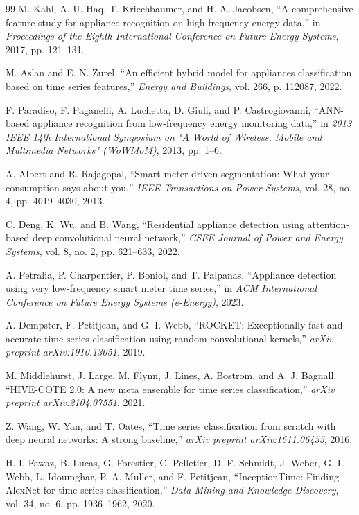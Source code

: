 \documentclass[conference]{IEEEtran}
\begin{document}
\begin{thebibliography}{99}
M. Kahl, A. U. Haq, T. Kriechbaumer, and H.-A. Jacobsen, ``A comprehensive feature study for appliance recognition on high frequency energy data,'' in \textit{Proceedings of the Eighth International Conference on Future Energy Systems}, 2017, pp. 121--131.

M. Aslan and E. N. Zurel, ``An efficient hybrid model for appliances classification based on time series features,'' \textit{Energy and Buildings}, vol. 266, p. 112087, 2022.

F. Paradiso, F. Paganelli, A. Luchetta, D. Giuli, and P. Castrogiovanni, ``ANN-based appliance recognition from low-frequency energy monitoring data,'' in \textit{2013 IEEE 14th International Symposium on "A World of Wireless, Mobile and Multimedia Networks" (WoWMoM)}, 2013, pp. 1--6.

A. Albert and R. Rajagopal, ``Smart meter driven segmentation: What your consumption says about you,'' \textit{IEEE Transactions on Power Systems}, vol. 28, no. 4, pp. 4019--4030, 2013.

C. Deng, K. Wu, and B. Wang, ``Residential appliance detection using attention-based deep convolutional neural network,'' \textit{CSEE Journal of Power and Energy Systems}, vol. 8, no. 2, pp. 621--633, 2022.

A. Petralia, P. Charpentier, P. Boniol, and T. Palpanas, ``Appliance detection using very low-frequency smart meter time series,'' in \textit{ACM International Conference on Future Energy Systems (e-Energy)}, 2023.

A. Dempster, F. Petitjean, and G. I. Webb, ``ROCKET: Exceptionally fast and accurate time series classification using random convolutional kernels,'' \textit{arXiv preprint arXiv:1910.13051}, 2019.

M. Middlehurst, J. Large, M. Flynn, J. Lines, A. Bostrom, and A. J. Bagnall, ``HIVE-COTE 2.0: A new meta ensemble for time series classification,'' \textit{arXiv preprint arXiv:2104.07551}, 2021.

Z. Wang, W. Yan, and T. Oates, ``Time series classification from scratch with deep neural networks: A strong baseline,'' \textit{arXiv preprint arXiv:1611.06455}, 2016.

H. I. Fawaz, B. Lucas, G. Forestier, C. Pelletier, D. F. Schmidt, J. Weber, G. I. Webb, L. Idoumghar, P.-A. Muller, and F. Petitjean, ``InceptionTime: Finding AlexNet for time series classification,'' \textit{Data Mining and Knowledge Discovery}, vol. 34, no. 6, pp. 1936--1962, 2020.


\end{thebibliography}
\end{document}
